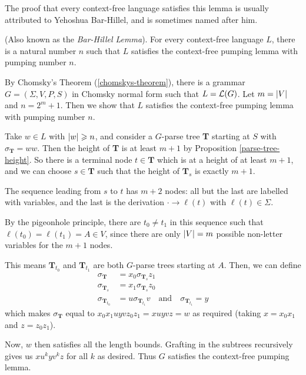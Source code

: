 \documentclass{article}
\begin{document}
The proof that every context-free language satisfies this lemma is usually attributed to Yehoshua Bar-Hillel, and is sometimes named after him.

\begin{theorem}
	\label{context-free-pumping-lemma}
	(Also known as the \textit{Bar-Hillel Lemma}). For every context-free language $L$, there is a natural number $n$ such that $L$ satisfies the context-free pumping lemma with pumping number $n$.
\end{theorem}

\begin{prf}
	By Chomsky's Theorem (\ref{chomskys-theorem}), there is a grammar $G = (\Sigma, V, P, S)$ in Chomsky normal form such that $L = \mathcal{L}(G)$. Let $m = \left\lvert V \right\rvert$ and $n = 2^m + 1$. Then we show that $L$ satisfies the context-free pumping lemma with pumping number $n$.
	    
	Take $w \in L$ with $\left\lvert w \right\rvert \geqslant n$, and consider a $G$-parse tree \textbf{T} starting at $S$ with $\sigma_\textbf{T} = ww$. Then the height of \textbf{T} is at least $m + 1$ by Proposition \ref{parse-tree-height}. So there is a terminal node $t \in \textbf{T}$ which is at a height of at least $m + 1$, and we can choose $s \in \textbf{T}$ such that the height of $\textbf{T}_s$ is exactly $m+1$.
	    
	The sequence leading from $s$ to $t$ has $m+2$ nodes: all but the last are labelled with variables, and the last is the derivation $\cdot \to \ell(t)$ with $\ell(t) \in \Sigma$.
	    
	By the pigeonhole principle, there are $t_0 \neq t_1$ in this sequence such that $\ell(t_0) = \ell(t_1) = A \in V$, since there are only $\left\lvert V \right\rvert = m$ possible non-letter variables for the $m+1$ nodes.
	    
	This means $\textbf{T}_{t_0}$ and $\textbf{T}_{t_1}$ are both $G$-parse trees starting at $A$. Then, we can define
	\begin{align*}
		\sigma_\textbf{T}         & = x_0 \sigma_{\textbf{T}_s} z_1                        \\
		\sigma_{\textbf{T}_s}     & = x_1 \sigma_{\textbf{T}_s} z_0                        \\
		\sigma_{\textbf{T}_{t_0}} & = u \sigma_{\textbf{T}_{t_1}} v \quad \text{and} \quad 
		\sigma_{\textbf{T}_{t_1}} = y
	\end{align*}
	which makes $\sigma_\textbf{T}$ equal to $x_0x_1uyvz_0z_1 = xuyvz = w$ as required (taking $x = x_0x_1$ and $z=z_0z_1$).
		
	Now, $w$ then satisfies all the length bounds. Grafting in the subtrees recursively gives us $xu^kyv^kz$ for all $k$ as desired. Thus $G$ satisfies the context-free pumping lemma.
\end{prf}
\end{document}
